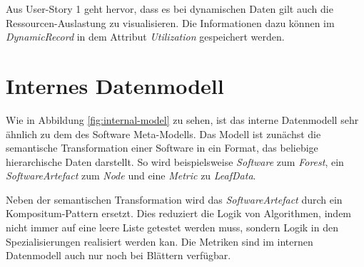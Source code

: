 Aus User-Story 1 geht hervor, dass es bei dynamischen Daten gilt auch die Ressourcen-Auslastung zu visualisieren. Die Informationen dazu können im \textit{DynamicRecord} in dem Attribut \textit{Utilization} gespeichert werden. 

\section{Internes Datenmodell}
\label{sec:app-model}

Wie in Abbildung \ref{fig:internal-model} zu sehen, ist das interne Datenmodell sehr ähnlich zu dem des Software Meta-Modells. Das Modell ist zunächst die semantische Transformation einer Software in ein Format, das beliebige hierarchische Daten darstellt. So wird beispielsweise \textit{Software} zum \textit{Forest}, ein \textit{SoftwareArtefact} zum \textit{Node} und eine \textit{Metric} zu \textit{LeafData}.

Neben der semantischen Transformation wird das \textit{SoftwareArtefact} durch ein Kompositum-Pattern ersetzt. Dies reduziert die Logik von Algorithmen, indem nicht immer auf eine leere Liste getestet werden muss, sondern Logik in den Spezialisierungen realisiert werden kan. Die Metriken sind im internen Datenmodell auch nur noch bei Blättern verfügbar.

